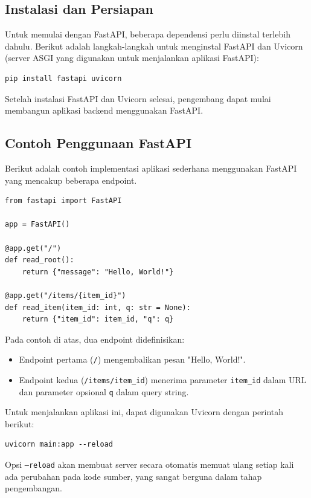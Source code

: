 \subsection{Instalasi dan Persiapan}
Untuk memulai dengan FastAPI, beberapa dependensi perlu diinstal terlebih dahulu. Berikut adalah langkah-langkah untuk menginstal FastAPI dan Uvicorn (server ASGI yang digunakan untuk menjalankan aplikasi FastAPI):

\begin{verbatim}
pip install fastapi uvicorn
\end{verbatim}

Setelah instalasi FastAPI dan Uvicorn selesai, pengembang dapat mulai membangun aplikasi backend menggunakan FastAPI.

\subsection{Contoh Penggunaan FastAPI}
Berikut adalah contoh implementasi aplikasi sederhana menggunakan FastAPI yang mencakup beberapa endpoint.

\begin{verbatim}
from fastapi import FastAPI

app = FastAPI()

@app.get("/")
def read_root():
    return {"message": "Hello, World!"}

@app.get("/items/{item_id}")
def read_item(item_id: int, q: str = None):
    return {"item_id": item_id, "q": q}
\end{verbatim}

Pada contoh di atas, dua endpoint didefinisikan:

\begin{itemize}
    \item Endpoint pertama (\texttt{/}) mengembalikan pesan "Hello, World!".
    \item Endpoint kedua (\texttt{/items/{item\_id}}) menerima parameter \texttt{item\_id} dalam URL dan parameter opsional \texttt{q} dalam query string.
\end{itemize}

Untuk menjalankan aplikasi ini, dapat digunakan Uvicorn dengan perintah berikut:

\begin{verbatim}
uvicorn main:app --reload
\end{verbatim}

Opsi \texttt{--reload} akan membuat server secara otomatis memuat ulang setiap kali ada perubahan pada kode sumber, yang sangat berguna dalam tahap pengembangan.

